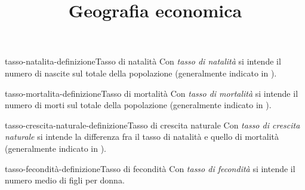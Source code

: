 \documentclass[preview]{standalone}
\begin{document}
\title{Geografia economica}
\genpage



\begin{snippetdefinition}{tasso-natalita-definizione}{Tasso di natalità}
    Con \textit{tasso di natalità}
    si intende il numero di nascite sul totale della popolazione
    (generalmente indicato in \textperthousand).
\end{snippetdefinition}

\begin{snippetdefinition}{tasso-mortalita-definizione}{Tasso di mortalità}
    Con \textit{tasso di mortalità}
    si intende il numero di morti sul totale della popolazione
    (generalmente indicato in \textperthousand).
\end{snippetdefinition}

\begin{snippetdefinition}{tasso-crescita-naturale-definizione}{Tasso di crescita naturale}
    Con \textit{tasso di crescita naturale}
    si intende la differenza fra il tasso di natalità e quello di mortalità
    (generalmente indicato in \textperthousand).
\end{snippetdefinition}

\begin{snippetdefinition}{tasso-fecondità-definizione}{Tasso di fecondità}
    Con \textit{tasso di fecondità}
    si intende il numero medio di figli per donna.
\end{snippetdefinition}
\end{document}
